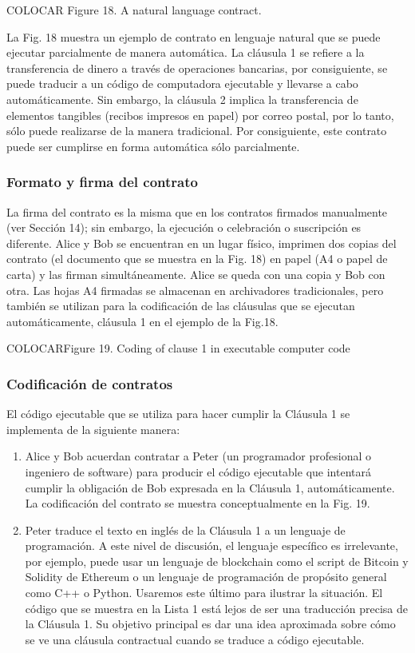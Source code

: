 \documentclass[12pt]{report} %
\begin{document}
\begin{itemize}
COLOCAR Figure 18. A natural language contract.

La Fig. 18 muestra un ejemplo de contrato en lenguaje natural que se puede ejecutar  parcialmente de manera automática. La cláusula 1 se refiere a la transferencia de dinero a través de operaciones bancarias, por consiguiente, se puede traducir a un código de computadora ejecutable y llevarse a cabo automáticamente. Sin embargo, la cláusula 2 implica la transferencia de elementos tangibles (recibos impresos en papel) por correo postal, por lo tanto, sólo puede realizarse de la manera tradicional. Por consiguiente, este contrato puede ser cumplirse en forma automática sólo parcialmente.

\subsubsection{Formato y firma del contrato}

La firma del contrato es la misma que en los contratos firmados manualmente (ver Sección 14); sin embargo, la ejecución o celebración o suscripción es diferente. Alice y Bob se encuentran en un lugar físico, imprimen dos copias del contrato (el documento que se muestra en la Fig. 18) en papel (A4 o papel de carta) y las firman simultáneamente. Alice se queda con una copia y Bob con otra. Las hojas A4 firmadas se almacenan en archivadores tradicionales, pero también se utilizan para la codificación de las cláusulas que se ejecutan automáticamente, cláusula 1 en el ejemplo de la Fig.18.

COLOCARFigure 19. Coding of clause 1 in executable computer code

\subsubsection{Codificación de contratos}

El código ejecutable que se utiliza para hacer cumplir la Cláusula 1 se implementa  de la siguiente manera:

\begin{enumerate}
    \item Alice y Bob acuerdan contratar a Peter (un programador profesional o ingeniero de software) para producir el código ejecutable que intentará cumplir la obligación de Bob expresada en la Cláusula 1, automáticamente. La codificación del contrato se muestra conceptualmente en la Fig. 19.
    \item Peter traduce el texto en inglés de la Cláusula 1 a un lenguaje de programación. A este nivel de discusión, el lenguaje específico es irrelevante, por ejemplo, puede usar un lenguaje de blockchain como el script de Bitcoin y Solidity de Ethereum o un lenguaje de programación de propósito general como C++ o Python. Usaremos este último para ilustrar la situación. El código que se muestra en la Lista 1 está lejos de ser una traducción precisa de la Cláusula 1. Su objetivo principal es dar una idea aproximada sobre cómo se ve una cláusula contractual cuando se traduce a código ejecutable.


\end{enumerate}
\end{itemize}
\end{document}
